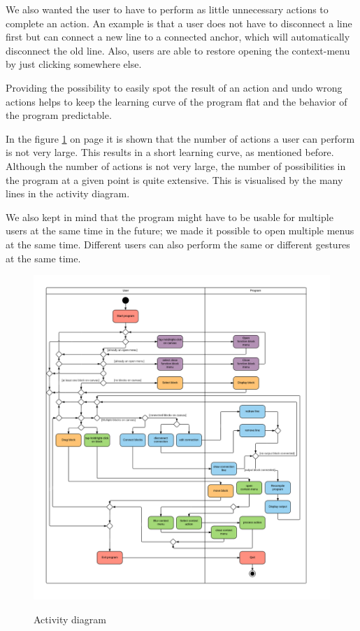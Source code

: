 We also wanted the user to have to perform as little unnecessary actions to complete an action.
An example is that a user does not have to disconnect a line first but can connect a new line to a connected anchor, which will automatically disconnect the old line.
Also, users are able to restore opening the context-menu by just clicking somewhere else.

Providing the possibility to easily spot the result of an action and undo wrong actions helps to keep the learning curve of the program flat and the behavior of the program predictable.

In the figure \ref{fig:activitydiagram} on page \pageref{fig:activitydiagram} it is shown that the number of actions a user can perform is not very large. This results in a short learning curve, as mentioned before. Although the number of actions is not very large, the number of possibilities in the program at a given point is quite extensive. This is visualised by the many lines in the activity diagram.

We also kept in mind that the program might have to be usable for multiple users at the same time in the future; we made it possible to open multiple menus at the same time. Different users can also perform the same or different gestures at the same time.

\begin{figure}[p]
	\centering
	\includegraphics[width=\textwidth]{Images/activitydiagram}
	\label{fig:activitydiagram}
	\caption{Activity diagram}
\end{figure}

